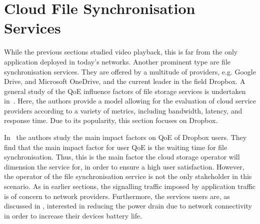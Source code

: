\section{Cloud File Synchronisation Services}\label{sec:application:cloud_file_synchronisation}

\newcommand{\dropbox}{\emph{DropBox}\xspace}
\newcommand{\imageFileSize}{\ensuremath{S_I}\xspace}
\newcommand{\imageArrivalRate}{\ensuremath{\lambda_I}\xspace}
\newcommand{\panTransferRate}{\ensuremath{B_{P}}\xspace}
\newcommand{\interarrivaltime}{\ensuremath{t_I}\xspace}
\newcommand{\clientpreparationtime}{\ensuremath{C}\xspace}
\newcommand{\uploadbandwidth}{\ensuremath{B_U}\xspace}
\newcommand{\idleThreshold}{\ensuremath{\tau}\xspace}
\newcommand{\serverpreparationtime}{\ensuremath{S}\xspace}
\newcommand{\downloadbandwidth}{\ensuremath{B_D}\xspace}
\newcommand{\startupDelay}{\ensuremath{\sigma}\xspace}
\newcommand{\sojournTime}{\ensuremath{\Sigma}\xspace}
\newcommand{\relativeDisconnectedTime}{\ensuremath{\Delta}\xspace}
\newcommand{\connectionCount}{\ensuremath{K}\xspace}
\newcommand{\algointerval}{\emph{Interval}\xspace}
\newcommand{\thresholdInterval}{\ensuremath{T_i}\xspace}
\newcommand{\thresholdSize}{\ensuremath{T_s}\xspace}
\newcommand{\thresholdNormalised}{\ensuremath{T_n}\xspace}
\newcommand{\algosize}{\emph{Size}\xspace}
\newcommand{\algoimmediate}{\emph{Immediate}\xspace}
\newcommand{\numberOfFiles}{\ensuremath{n}\xspace}

While the previous sections studied video playback, this is far from the only application deployed in today's networks.
Another prominent type are file synchronisation services.
They are offered by a multitude of providers, e.g. Google Drive, and Microsoft OneDrive, and the current leader in the field Dropbox.
A general study of the \gls{QoE} influence factors of file storage services is undertaken in~\cite{Qian2011b}.
Here, the authors provide a model allowing for the evaluation of cloud service providers according to a variety of metrics, including bandwidth, latency, and response time.
Due to its popularity, this section focuses on Dropbox.

In~\cite{Amrehm2013} the authors study the main impact factors on \gls{QoE} of Dropbox users.
They find that the main impact factor for user \gls{QoE} is the waiting time for file synchronisation.
Thus, this is the main factor the cloud storage operator will dimension the service for, in order to ensure a high user satisfaction. 
However, the operator of the file synchronisation service is not the only stakeholder in this scenario.
As in earlier sections, the signalling traffic imposed by application traffic is of concern to network providers.
Furthermore, the services users are, as discussed in , interested in reducing the power drain due to network connectivity in order to increase their devices battery life.

